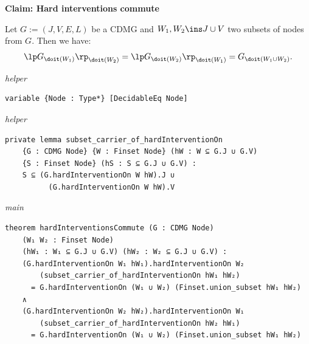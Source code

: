 \vspace{\appendixNotesGap}

\noindent\textbf{Claim: Hard interventions commute}\par\smallskip
{\appendixTexSize
\label{hard-interventions-commute}
    Let $G:=(J,V,E,L)$ be a CDMG and $W_1, W_2 \ins J \cup V$ two  subsets of nodes from $G$. 
      Then we have:
      \[ \lp G_{\doit(W_1)} \rp_{\doit(W_2)} = \lp G_{\doit(W_2)} \rp_{\doit(W_1)} =  G_{\doit(W_1 \cup W_2)}. \]
\par}
\smallskip
{\small\textit{helper}}
\begin{verbatim}
variable {Node : Type*} [DecidableEq Node]
\end{verbatim}
{\small\textit{helper}}
\begin{verbatim}
private lemma subset_carrier_of_hardInterventionOn
    {G : CDMG Node} {W : Finset Node} (hW : W ⊆ G.J ∪ G.V)
    {S : Finset Node} (hS : S ⊆ G.J ∪ G.V) :
    S ⊆ (G.hardInterventionOn W hW).J ∪
          (G.hardInterventionOn W hW).V
\end{verbatim}
{\small\textit{main}}
\begin{verbatim}
theorem hardInterventionsCommute (G : CDMG Node)
    (W₁ W₂ : Finset Node)
    (hW₁ : W₁ ⊆ G.J ∪ G.V) (hW₂ : W₂ ⊆ G.J ∪ G.V) :
    (G.hardInterventionOn W₁ hW₁).hardInterventionOn W₂
        (subset_carrier_of_hardInterventionOn hW₁ hW₂)
      = G.hardInterventionOn (W₁ ∪ W₂) (Finset.union_subset hW₁ hW₂)
    ∧
    (G.hardInterventionOn W₂ hW₂).hardInterventionOn W₁
        (subset_carrier_of_hardInterventionOn hW₂ hW₁)
      = G.hardInterventionOn (W₁ ∪ W₂) (Finset.union_subset hW₁ hW₂)
\end{verbatim}
~%

\vspace{\appendixNotesGap}

